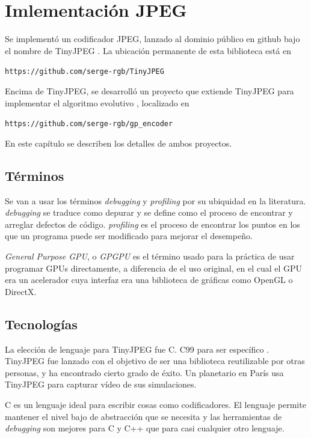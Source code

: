 \chapter{Imlementación JPEG}\label{ch:implementacion}

Se implementó un codificador JPEG, lanzado al dominio público en github bajo el
nombre de TinyJPEG \cite{tiny_jpeg}. La ubicación permanente de esta biblioteca
está en \begin{alltt}https://github.com/serge-rgb/TinyJPEG \end{alltt}

Encima de TinyJPEG, se desarrolló un proyecto que extiende TinyJPEG para
implementar el algoritmo evolutivo \cite{gp_encoder}, localizado en
\begin{alltt}https://github.com/serge-rgb/gp_encoder\end{alltt}

En este capítulo se describen los detalles de ambos proyectos.

\section {Términos}
Se van a usar los términos \emph{debugging} y \emph{profiling} por su ubiquidad
en la literatura. \emph{debugging} se traduce como depurar y se define como el
proceso de encontrar y arreglar defectos de código. \emph{profiling} es el
proceso de encontrar los puntos en los que un programa puede ser modificado
para mejorar el desempeño.

\emph{General Purpose GPU}, o \emph{GPGPU} es el
término usado para la práctica de usar programar GPUs directamente, a
diferencia de el uso original, en el cual el GPU era un acelerador cuya
interfaz era una biblioteca de gráficas como OpenGL o DirectX.

\section{Tecnologías}

La elección de lenguaje para TinyJPEG fue C. C99 para ser específico
\cite{c99}. TinyJPEG fue lanzado con el objetivo de ser una biblioteca
reutilizable por otras personas, y ha encontrado cierto grado de éxito. Un
planetario en París usa TinyJPEG para capturar vídeo de sus simulaciones.

C es un lenguaje ideal para escribir cosas como codificadores. El lenguaje
permite mantener el nivel bajo de abstracción que se necesita y las
herramientas de \emph{debugging} son mejores para C y C++ que para casi
cualquier otro lenguaje.

